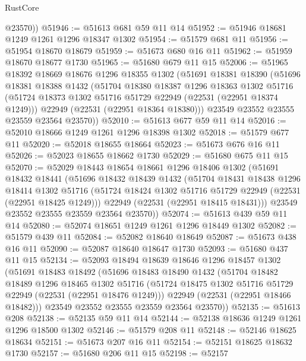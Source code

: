 \begin{lexlean}{RustCore}
\begin{coremodule}
        @23570))
@51946 := @51613 @681 @59 @11 @14
@51952 := @51946 @18681 @1249 @1261 @1296 @18347 @1302
@51954 := @51579 @681 @11
@51956 := @51954 @18670 @18679
@51959 := @51673 @680 @16 @11
@51962 := @51959 @18670 @18677 @1730
@51965 := @51680 @679 @11 @15
@52006 := @51965
    @18392
    @18669
    @18676
    @1296
    @18355
    @1302
    (@51691
      @18381
      @18390
      (@51696
        @18381
        @18388
        @1432
        (@51704
          @18380
          @18387
          @1296
          @18363
          @1302
          @51716
          (@51724 @18373 @1302 @51716 @51729 @22949 (@22531 (@22951 @18374 @1249)))
          @22949
          (@22531 (@22951 @18364 @18380)))
        @23549
        @23552
        @23555
        @23559
        @23564
        @23570))
@52010 := @51613 @677 @59 @11 @14
@52016 := @52010 @18666 @1249 @1261 @1296 @18398 @1302
@52018 := @51579 @677 @11
@52020 := @52018 @18655 @18664
@52023 := @51673 @676 @16 @11
@52026 := @52023 @18655 @18662 @1730
@52029 := @51680 @675 @11 @15
@52070 := @52029
    @18443
    @18654
    @18661
    @1296
    @18406
    @1302
    (@51691
      @18432
      @18441
      (@51696
        @18432
        @18439
        @1432
        (@51704
          @18431
          @18438
          @1296
          @18414
          @1302
          @51716
          (@51724 @18424 @1302 @51716 @51729 @22949 (@22531 (@22951 @18425 @1249)))
          @22949
          (@22531 (@22951 @18415 @18431)))
        @23549
        @23552
        @23555
        @23559
        @23564
        @23570))
@52074 := @51613 @439 @59 @11 @14
@52080 := @52074 @18651 @1249 @1261 @1296 @18449 @1302
@52082 := @51579 @439 @11
@52084 := @52082 @18640 @18649
@52087 := @51673 @438 @16 @11
@52090 := @52087 @18640 @18647 @1730
@52093 := @51680 @437 @11 @15
@52134 := @52093
    @18494
    @18639
    @18646
    @1296
    @18457
    @1302
    (@51691
      @18483
      @18492
      (@51696
        @18483
        @18490
        @1432
        (@51704
          @18482
          @18489
          @1296
          @18465
          @1302
          @51716
          (@51724 @18475 @1302 @51716 @51729 @22949 (@22531 (@22951 @18476 @1249)))
          @22949
          (@22531 (@22951 @18466 @18482)))
        @23549
        @23552
        @23555
        @23559
        @23564
        @23570))
@52135 := @51613 @208
@52138 := @52135 @59 @11 @14
@52144 := @52138 @18636 @1249 @1261 @1296 @18500 @1302
@52146 := @51579 @208 @11
@52148 := @52146 @18625 @18634
@52151 := @51673 @207 @16 @11
@52154 := @52151 @18625 @18632 @1730
@52157 := @51680 @206 @11 @15
@52198 := @52157

\end{coremodule}
\end{lexlean}
